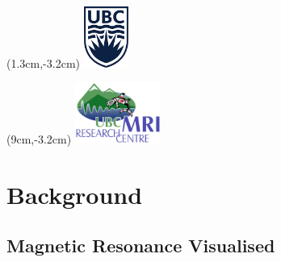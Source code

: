 



\begin{frame}
\titlepage
\begin{textblock*}{2cm}(1.3cm,-3.2cm)
    \includegraphics[height=2cm]{figures/ubc-logo}
\end{textblock*}
\begin{textblock*}{2cm}(9cm,-3.2cm)
    \includegraphics[height=2cm]{figures/UBC-MRI-logo}
\end{textblock*}
\end{frame}

\begin{frame}
\tableofcontents
\end{frame}


\section{Background}

\subsection{Magnetic Resonance Visualised}

